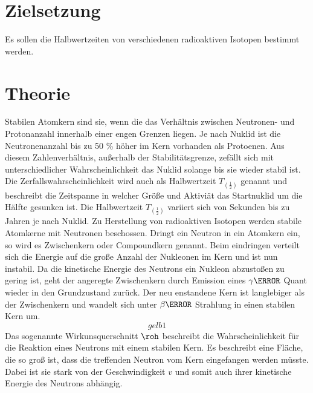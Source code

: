 \section{Zielsetzung}
Es sollen die Halbwertzeiten von verschiedenen radioaktiven Isotopen bestimmt werden.
\section{Theorie}
Stabilen Atomkern sind sie, wenn die das Verhältnis zwischen Neutronen- und Protonanzahl innerhalb einer engen Grenzen
liegen.
Je nach Nuklid ist die Neutronenanzahl bis zu 50 \% höher im Kern vorhanden als Protoenen.
Aus diesem Zahlenverhältnis, außerhalb der Stabilitätsgrenze, zefällt sich mit unterschiedlicher Wahrscheinlichkeit
das Nuklid solange bis sie wieder stabil ist.
Die Zerfallswahrscheinlichkeit wird auch als Halbwertzeit $T_(\frac{1}{2})$ genannt und beschreibt
die Zeitspanne in welcher Größe und Aktiviät das Startnuklid um die Hälfte gesunken ist.
Die Halbwertzeit $T_(\frac{1}{2})$ variiert sich von Sekunden bis zu Jahren je nach Nuklid.
Zu Herstellung von radioaktiven Isotopen werden stabile Atomkerne mit Neutronen beschossen.
Dringt ein Neutron in ein Atomkern ein, so wird es Zwischenkern oder Compoundkern genannt.
Beim eindringen verteilt sich die Energie auf die große Anzahl der Nukleonen im Kern und ist nun instabil.
Da die kinetische Energie des Neutrons ein Nukleon abzustoßen zu gering ist, geht der angeregte Zwischenkern durch
Emission eines $\gamma \m$ Quant wieder in den Grundzustand zurück.
Der neu enstandene Kern ist langlebiger als der Zwischenkern und wandelt sich unter $\beta \m$ Strahlung in einen stabilen
Kern um.
\begin{equation*}
  gelb 1
\end{equation*}
Das sogenannte Wirkunsquerschnitt $\roh$ beschreibt die Wahrscheinlichkeit für die Reaktion eines Neutrons mit einem stabilen Kern.
Es beschreibt eine Fläche, die so groß ist, dass die treffenden Neutron vom Kern eingefangen werden müsste.
Dabei ist sie stark von der Geschwindigkeit $v$ und somit auch ihrer kinetische Energie des Neutrons abhängig. 
